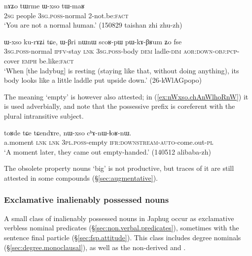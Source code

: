 \begin{exe}
\ex \label{ex:tWrme.Wxso}
\gll  nɤʑo tɯrme ɯ-xso tɯ-maʁ \\
\textsc{2sg} people \textsc{3sg}.\textsc{poss}-normal 2-not.be:\textsc{fact} \\
\glt `You are not a normal human.' (150829 taishan zhi zhu-zh) 
\end{exe} 

\begin{exe}
\ex \label{ex:Wxso.kurAZi}
\gll ɯ-xso ku-rɤʑi tɕe, ɯ-βri nɯnɯ scoʁ-pɯ pɯ-kɤ-βʁum ʑo fse \\
\textsc{3sg}.\textsc{poss}-normal \textsc{ipfv}-stay \textsc{lnk} \textsc{3sg}.\textsc{poss}-body \textsc{dem} ladle-\textsc{dim} \textsc{aor}:\textsc{down}-\textsc{obj}:\textsc{pcp}-cover \textsc{emph} be.like:\textsc{fact} \\
\glt `When [the ladybug] is resting (staying like that, without doing anything), its body looks like a little laddle put upside down.' (26-kWlAGpopo) 
\end{exe} 

The meaning `empty' is however also attested; in (\ref{ex:nWxso.chAnWlhoRnW}) it is used adverbially, and note that the possessive prefix is coreferent with the plural intransitive subject.

\begin{exe}
\ex \label{ex:nWxso.chAnWlhoRnW}
\gll toʁde tɕe tɕendɤre, nɯ-xso cʰɤ-nɯ-ɬoʁ-nɯ. \\
a.moment \textsc{lnk} \textsc{lnk} \textsc{3pl}.\textsc{poss}-empty \textsc{ifr}:\textsc{downstream}-\textsc{auto}-come.out-\textsc{pl} \\
\glt `A moment later, they came out empty-handed.' (140512 alibaba-zh)
\end{exe} 

The obsolete property nouns  `big' is not productive, but traces of it are still attested in some compounds (§\ref{sec:augmentative}).

\subsubsection{Exclamative inalienably possessed nouns} \label{sec:exclamative.IPN}
A small class of inalienably possessed nouns in Japhug occur as exclamative verbless nominal predicates (§\ref{sec:non.verbal.predicates}), sometimes with the sentence final particle  (§\ref{sec:fsp.attitude}). This class includes degree nominals (§\ref{sec:degree.monoclausal}), as well as the non-derived  and . 

